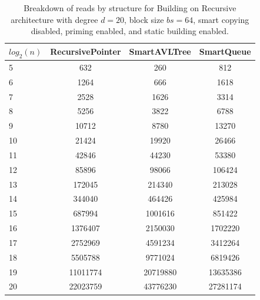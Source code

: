 \begin{table}[]
\centering
\begin{tabular}{|l|c|c|c|}
$log_2(n)$ & RecursivePointer & SmartAVLTree & SmartQueue \\ \hline
5 & 632 & 260 & 812 \\ \hline
6 & 1264 & 666 & 1618 \\ \hline
7 & 2528 & 1626 & 3314 \\ \hline
8 & 5256 & 3822 & 6788 \\ \hline
9 & 10712 & 8780 & 13270 \\ \hline
10 & 21424 & 19920 & 26466 \\ \hline
11 & 42846 & 44230 & 53380 \\ \hline
12 & 85896 & 98066 & 106424 \\ \hline
13 & 172045 & 214340 & 213028 \\ \hline
14 & 344040 & 464426 & 425984 \\ \hline
15 & 687994 & 1001616 & 851422 \\ \hline
16 & 1376407 & 2150030 & 1702220 \\ \hline
17 & 2752969 & 4591234 & 3412264 \\ \hline
18 & 5505788 & 9771024 & 6819426 \\ \hline
19 & 11011774 & 20719880 & 13635386 \\ \hline
20 & 22023759 & 43776230 & 27281174 \\ \hline
\end{tabular}
\caption{Breakdown of reads by structure for Building on Recursive architecture with degree $d=20$, block size $bs=64$, smart copying disabled, priming enabled, and static building enabled.}
    \label{tab:reads_by_structure_build_d20_bs64_copiesfalse_primetrue_staticinsertiontrue_ptrecursive_movetrue}
\end{table}

